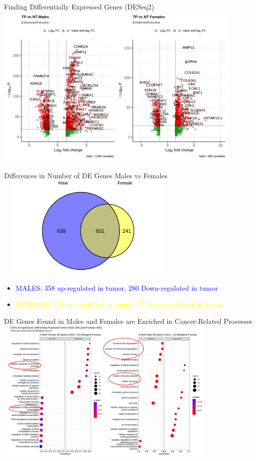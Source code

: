 \documentclass{beamer}
\begin{document}
	\begin{frame}{Finding Differentially Expressed Genes (DESeq2)}
		\includegraphics[width=12cm, height=8cm]{all_cancersvolcano_analysis_0.9.png
		}
	\end{frame}

	\begin{frame}{Differences in Number of DE Genes Males vs Females}
		\centering \includegraphics[width=9cm, height=5cm]{all_cancersvenndiagram_malede_vs_femalede_0.9.png}
		\begin{itemize}
			\item \textcolor{blue}{MALES: 358 up-regulated in tumor, 280 Down-regulated in tumor}
			\item \textcolor{yellow}{FEMALES: 171 up-regulated in tumor, 70 down-regulated in tumor}
		\end{itemize}
	\end{frame}

	\begin{frame}{DE Genes Found in Males and Females are Enriched in Cancer-Related Processes}
		\includegraphics[width=11cm, height=7cm]{all_cancersgsea_inbothdegenes_male_female_bp0.9.png}
	\end{frame}
\end{document}
